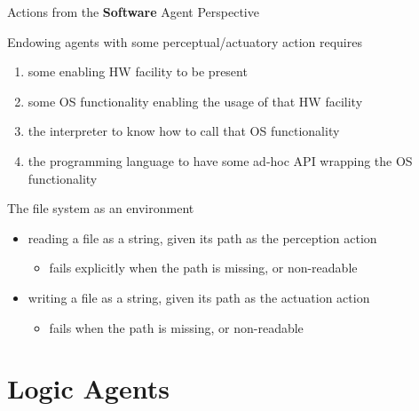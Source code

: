 \documentclass[presentation]{beamer}\mode<presentation>{\usetheme{AMSBolognaFC}}
\begin{document}
\begin{frame}[allowframebreaks]{Actions from the \textbf{Software} Agent Perspective}

    \begin{alertblock}{Endowing agents with some perceptual/actuatory action requires}
        \begin{enumerate}
            \item some enabling HW facility to be present
            \item some OS functionality enabling the usage of that HW facility
            \item the interpreter to know how to call that OS functionality
            \item the programming language to have some ad-hoc API wrapping the OS functionality
        \end{enumerate}
    \end{alertblock}

    \begin{exampleblock}{The file system as an environment}
        \begin{itemize}
            \item \alert{reading} a file as a string, given its path as the \alert{perception} action
            \begin{itemize}
                \item fails explicitly  when the path is missing, or non-readable
            \end{itemize}

            \item \alert{writing} a file as a string, given its path as the \alert{actuation} action
            \begin{itemize}
                \item fails when the path is missing, or non-readable
            \end{itemize}
        \end{itemize}
    \end{exampleblock}
\end{frame}

\section{Logic Agents}
\end{document}
